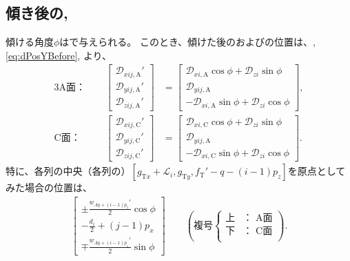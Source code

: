 \subsection{傾き後の\AfaceDimple, \CfaceDimple}
傾ける角度$\phi$はで与えられる。
このとき、傾けた後の\AFaceDimpleIRowJ および\CFaceDimpleIRowJ の位置は、, \eqref{eq:dPosYBefore}, より、
\begin{alignat*}{3}
  \text{A面：}&~~&
  \left[
  \begin{array}{c}
    \mathcal D_{xij,\mathrm A}'\\
    \mathcal D_{yij,\mathrm A}'\\
    \mathcal D_{zij,\mathrm A}'
  \end{array}
  \right]
 &= \left[
    \begin{array}{c}
      \mathcal D_{xi,\mathrm A}\cos\phi+\mathcal D_{zi}\sin\phi\\
      \mathcal D_{yij,\mathrm A}\\
      -\mathcal D_{xi,\mathrm A}\sin\phi+\mathcal D_{zi}\cos\phi
    \end{array}
    \right],\\[2pt]
  \text{C面：}&~~&
  \left[
  \begin{array}{c}
    \mathcal D_{xij,\mathrm C}'\\
    \mathcal D_{yij,\mathrm C}'\\
    \mathcal D_{zij,\mathrm C}'
  \end{array}
  \right]
 &= \left[
    \begin{array}{c}
      \mathcal D_{xi,\mathrm C}\cos\phi+\mathcal D_{zi}\sin\phi\\
      \mathcal D_{yij,\mathrm A}\\
      -\mathcal D_{xi,\mathrm C}\sin\phi+\mathcal D_{zi}\cos\phi
    \end{array}
    \right].
\end{alignat*}
特に、各列の中央（各列の\nameCurvatureCenter）$[g_{\mathrm Tx}+\mathcal L_i, g_{\mathrm Ty}, f_\mathrm T'-q-(i-1)p_z]$を原点としてみた場合の位置は、
\begin{align*}
  \left[
  \begin{array}{c}
    \displaystyle \pm\frac{w_{Aq+(i-1)p_z}'}2\cos\phi\\[6pt]
    \displaystyle -\frac{d_i}2+(j-1)p_x\\[6pt]
    \displaystyle \mp\frac{w_{Aq+(i-1)p_z}'}2\sin\phi
  \end{array}
  \right]\qquad
  \left(
  \text{複号}
  \left\{
  \begin{array}{rl}
    \!\text{上}\!\!\!\!& \text{： A面}\\
    \!\text{下}\!\!\!\!& \text{： C面}\\
  \end{array}
  \right.
  \right).
\end{align*}





